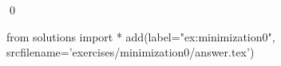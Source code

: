 
\begin{ex} 
  \label{ex:minimization0}
  
  \qed
\end{ex} 
\begin{python0}
from solutions import *
add(label="ex:minimization0",
    srcfilename='exercises/minimization0/answer.tex') 
\end{python0}
